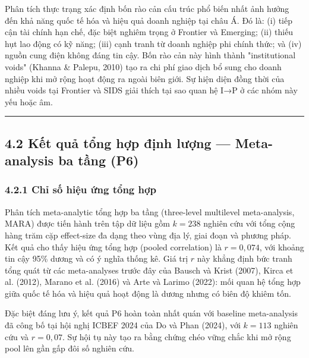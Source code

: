 \documentclass[12pt,a4paper]{article}
\begin{document}
Phân tích thực trạng xác định bốn rào cản cấu trúc phổ biến nhất ảnh
hưởng đến khả năng quốc tế hóa và hiệu quả doanh nghiệp tại châu Á. Đó
là: (i) tiếp cận tài chính hạn chế, đặc biệt nghiêm trọng ở Frontier và
Emerging; (ii) thiếu hụt lao động có kỹ năng; (iii) cạnh tranh từ doanh
nghiệp phi chính thức; và (iv) nguồn cung điện không đáng tin cậy. Bốn
rào cản này hình thành "institutional voids" (Khanna \& Palepu, 2010)
tạo ra chi phí giao dịch bổ sung cho doanh nghiệp khi mở rộng hoạt động
ra ngoài biên giới. Sự hiện diện đồng thời của nhiều voids tại Frontier
và SIDS giải thích tại sao quan hệ I→P ở các nhóm này yếu hoặc âm.

\begin{center}\rule{0.5\linewidth}{0.5pt}\end{center}

\hypertarget{42-kux1ebft-quux1ea3-tux1ed5ng-hux1ee3p-ux111ux1ecbnh-lux1b0ux1ee3ng--meta-analysis-ba-tux1ea7ng-p6}{%
\subsection{4.2 Kết quả tổng hợp định lượng --- Meta-analysis ba tầng
(P6)}\label{42-kux1ebft-quux1ea3-tux1ed5ng-hux1ee3p-ux111ux1ecbnh-lux1b0ux1ee3ng--meta-analysis-ba-tux1ea7ng-p6}}

\hypertarget{421-chux1ec9-sux1ed1-hiux1ec7u-ux1ee9ng-tux1ed5ng-hux1ee3p}{%
\subsubsection{4.2.1 Chỉ số hiệu ứng tổng
hợp}\label{421-chux1ec9-sux1ed1-hiux1ec7u-ux1ee9ng-tux1ed5ng-hux1ee3p}}

Phân tích meta-analytic tổng hợp ba tầng (three-level multilevel
meta-analysis, MARA) được tiến hành trên tập dữ liệu gồm \(k = 238\)
nghiên cứu với tổng cộng hàng trăm cặp effect-size đa dạng theo vùng địa
lý, giai đoạn và phương pháp. Kết quả cho thấy hiệu ứng tổng hợp (pooled
correlation) là \(r = 0{,}074\), với khoảng tin cậy 95\% dương và có ý
nghĩa thống kê. Giá trị \(r\) này khẳng định bức tranh tổng quát từ các
meta-analyses trước đây của Bausch và Krist (2007), Kirca et al. (2012),
Marano et al. (2016) và Arte và Larimo (2022): mối quan hệ tổng hợp giữa
quốc tế hóa và hiệu quả hoạt động là dương nhưng có biên độ khiêm tốn.

Đặc biệt đáng lưu ý, kết quả P6 hoàn toàn nhất quán với baseline
meta-analysis đã công bố tại hội nghị ICBEF 2024 của Do và Phan (2024),
với \(k = 113\) nghiên cứu và \(r = 0{,}07\). Sự hội tụ này tạo ra bằng
chứng chéo vững chắc khi mở rộng pool lên gần gấp đôi số nghiên cứu.
\end{document}
